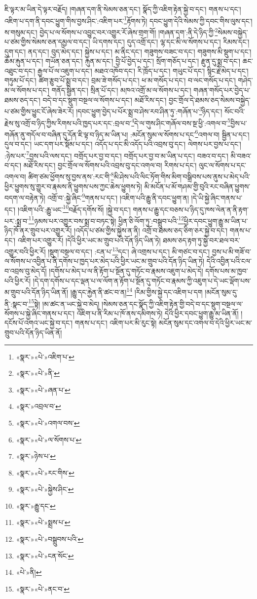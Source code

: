 ཇི་ལྟར་མ་ཡིན་དེ་ལྟར་བརྗོད། །གཞན་དག་ནི་སེམས་ཅན་དང་། སྣོད་ཀྱི་འཇིག་རྟེན་སྐྱེ་བ་དང་། གནས་པ་དང་། འཇིག་པ་དག་ནི་དབང་ཕྱུག་གིས་བྱས་ཤིང་:འཇིག་པར་\footnote{«སྣར་»«པེ་»འཇིག་པ་}རྟོགས་ཏེ། དབང་ཕྱུག་དེའི་སེམས་ཀྱི་དབང་གིས་ལུས་དང་། ས་གསུམ་དང་། བྱེད་པ་ལ་སོགས་པ་འབྱུང་བར་འགྱུར་རོ་ཞེས་གྲག་གོ། །གཞན་དག་:ནི་དེ་ཉིད་ཀྱི་\footnote{«སྣར་»«པེ་»ནི་}སེམས་བསྐྱེད་པ་ཙམ་གྱིས་སེམས་ཅན་དམྱལ་བ་དང་། ཡི་དགས་དང་། དུད་འགྲོ་དང་། ལྷ་དང་མི་ལ་སོགས་པ་དང་། རིམས་དང་། དུག་དང་། ནད་དང་། བུད་མེད་དང་། སྐྱེས་པ་དང་། མ་ནིང་དང་། གཟུགས་བཟང་བ་དང་། གཟུགས་མི་སྡུག་པ་དང་། ཆོམ་རྐུན་པ་དང་། གཡོན་ཅན་དང་། རྐུན་མ་དང་། བྱི་པོ་བྱེད་པ་དང་། སྲོག་གཅོད་པ་དང་། རྫུན་དུ་སྨྲ་བ་དང་། ཆང་འཐུང་བ་དང་། རྒྱལ་པོ་ལ་འཇུག་པ་དང་། མཐའ་འཁོབ་དང་། རི་ཁྲོད་པ་དང་། གཡུང་པོ་དང་། སྙིང་རྗེ་མེད་པ་དང་། གཏུམ་པོ་དང་། ཚིག་རྩུབ་པོ་སྨྲ་བ་དང་། བྲམ་ཟེ་གསོད་པ་དང་། ཕ་མ་གསོད་པ་དང་། བ་ལང་གསོད་པ་དང་། གཤེད་མ་ལ་སོགས་པ་དང་། གནོད་སྦྱིན་དང་། སྲིན་པོ་དང་། མཁའ་འགྲོ་མ་ལ་སོགས་པ་དང་། གཞན་གསོད་པར་བྱེད་པ་ཐམས་ཅད་དང་། བདེ་བ་དང་སྡུག་བསྔལ་ལ་སོགས་པ་དང་། མཐོ་རིས་དང་། བྱང་གྲོལ་དེ་ཐམས་ཅད་སེམས་བསྐྱེད་པ་ཙམ་གྱིས་ཕྱུང་ངོ་ཞེས་ཟེར་རོ། །དབང་ཕྱུག་བྱེད་པ་པོར་སྨྲ་བ་ཤེས་རབ་ཤིན་ཏུ་:གཞོན་པ་\footnote{«སྣར་»«པེ་»ཞན་པ་}ཉིད་དང་། སོང་བའི་རྗེས་སུ་འགྲོ་བ་ཉིད་ཀྱིས་རིགས་པའི་ཁྱད་པར་དང་:བྲལ་བ་\footnote{«སྣར་»འབྲལ་བ་}དེ་ལ་གུས་ཤིང་གཞོལ་བས་སྔ་ཕྱི་:འགལ་བ་\footnote{«སྣར་»«པེ་»འགལ་བས་}བྱིས་པ་གཞོན་ནུ་གདོལ་བ་བཞིན་དུ་དོན་ཇི་ལྟ་བ་ཉིད་མ་ཡིན་པ། :མངོན་སུམ་ལ་སོགས་པ་དང་\footnote{«སྣར་»«པེ་»ལ་སོགས་པ་}འགལ་བ། སྦྱིན་པ་དང་། དུལ་བ་དང་། ཡང་དག་པར་སྡོམ་པ་དང་། འདོད་པ་དང་མི་འདོད་པའི་འབྲས་བུ་དང་། ལེགས་པར་བྱས་པ་དང་། :ཉེས་པར་\footnote{«སྣར་»ཉེས་པ་}བྱས་པའི་ལས་དང་། བགྲོད་པར་བྱ་བ་དང་། བགྲོད་པར་བྱ་བ་མ་ཡིན་པ་དང་། བཟའ་བ་དང་། མི་བཟའ་བ་དང་། མཐོ་རིས་དང་། བྱང་གྲོལ་ལ་སོགས་པའི་འབྲས་བུ་དང་འགལ་བ། རིགས་པ་དང་། ལུང་ལ་སོགས་པ་དང་འགལ་བ། ཚིག་ཙམ་ཕྱོགས་སུ་བྱས་ནས་:རང་གི་\footnote{«སྣར་»«པེ་»རང་གིས་}མི་ཤེས་པའི་ལིང་ཏོག་གིས་མིག་བསྒྲིབས་པས་ནུས་པ་མེད་པའི་ཕྱིར་ཕྱུགས་སུ་གྱུར་བ་རྣམས་ནི་ཕྱུགས་པས་ཀྱང་ཆེས་ཕྱུགས་ཏེ། མི་མངོན་པ་མོ་གཤམ་གྱི་བུའི་རང་བཞིན་ཕྱུགས་བདག་ལ་བརྟེན་ཏེ། འགྲོ་བ་:སྐྱེ་ཞིང་\footnote{«སྣར་»«པེ་»སྐྱེས་ཤིང་}གནས་པ་དང་། །འཇིག་པའི་རྒྱུ་ནི་དབང་ཕྱུག་ན། །དེ་ཡི་སྐྱེ་ཞིང་གནས་པ་དང་། །འཇིག་པའི་:རྒྱུ་ཡང་\footnote{«སྣར་»རྒྱུ་དང་}བརྗོད་དགོས་སོ། །སྐྱེ་བ་དང་། གནས་པ་རྒྱུ་དང་བཅས་པ་ཉིད་དུ་ཁས་ལེན་ན་ནི་རྟག་པར་:སྨྲ་བ་\footnote{«སྣར་»«པེ་»སྨྲས་པ་}ཉམས་པར་འགྱུར་བས་སྨྲ་བ་བཏང་སྟེ། ཕྱིན་ཅི་ལོག་ཏུ་:བསྒྲུབ་པའི་\footnote{«སྣར་»«པེ་»བསྒྲུབས་པའི་}ཕྱིར་དབང་ཕྱུག་རྒྱུ་མ་ཡིན་པ་ཉིད་ཁོ་ནར་གྲུབ་པར་འགྱུར་རོ། །འདོད་པ་ཙམ་གྱིས་སྐྱེས་ན་ནི། འགྲོ་བ་ཐམས་ཅད་ཅིག་ཅར་སྐྱེ་བ་དང་། གནས་པ་དང་། འཇིག་པར་འགྱུར་རོ། །དེའི་ཕྱིར་ཡང་མ་གྲུབ་པའི་དོན་ཉིད་ཡིན་ཏེ། ཐམས་ཅད་རྟག་ཏུ་སྐྱེ་བར་ཐལ་བར་འགྱུར་བའི་ཕྱིར་རོ། །སྡུག་བསྔལ་བ་དང་། :ངན་པ་\footnote{«སྣར་»«པེ་»ངན་སོང་}དང་། ཞེ་འགྲས་པ་དང་། མི་གཙང་བ་དང་། བྱས་པ་མི་གཟོ་བ་ལ་སོགས་པ་འབྱིན་པ་ནི་དགོས་པ་ཁྱད་པར་མེད་པའི་ཕྱིར་ཡང་མ་གྲུབ་པའི་དོན་ཉིད་ཡིན་ཏེ། དེའི་འབྱིན་པའི་ངལ་བ་འབྲས་བུ་མེད་དོ། །དགོས་པ་མེད་པ་ལ་ནི་རྟོག་པ་སྔོན་དུ་གཏོང་བ་རྣམས་འཇུག་པ་མེད་དེ། དགོས་པས་མ་ཁྱབ་པའི་ཕྱིར་རོ། །དེ་དག་དགོས་པ་དང་ལྡན་པ་ལ་ལོག་ན་རྟོག་པ་སྔོན་དུ་གཏོང་བ་རྣམས་ཀྱི་འཇུག་པ་དེ་ཡང་ལྡོག་པས་མ་གྲུབ་པའི་དོན་ཉིད་ཡིན་ནོ། །རྒྱུ་དང་རྐྱེན་ནི་ཚང་བ་ན།\footnote{«པེ་»ནི།} །རིམ་གྱིས་སྐྱེ་དང་འཇིག་པ་དག །མངོན་སུམ་དུ་ནི་:སྣང་བ་\footnote{«སྣར་»«པེ་»ནང་བ་}སྟེ། །མ་ཚང་ན་ཡང་སྐྱེ་བ་མེད། །སེམས་ཅན་དང་སྣོད་ཀྱི་འཇིག་རྟེན་གྱི་བདེ་བ་དང་སྡུག་བསྔལ་ལ་སོགས་པ་སྐྱེ་ཞིང་གནས་པ་དང་། འཇིག་པ་ནི་རིམ་པ་ཁོ་ནས་དམིགས་ཏེ། དེའི་ཕྱིར་དབང་ཕྱུག་རྒྱུ་མ་ཡིན་ནོ། །དངོས་པོ་འགའ་ཡང་སྐྱེ་བ་དང་། གནས་པ་དང་། འཇིག་པར་མི་རུང་སྟེ། མངོན་སུམ་དང་འགལ་བ་དེའི་ཕྱིར་ཡང་མ་གྲུབ་པའི་དོན་ཉིད་ཡིན་ནོ། 